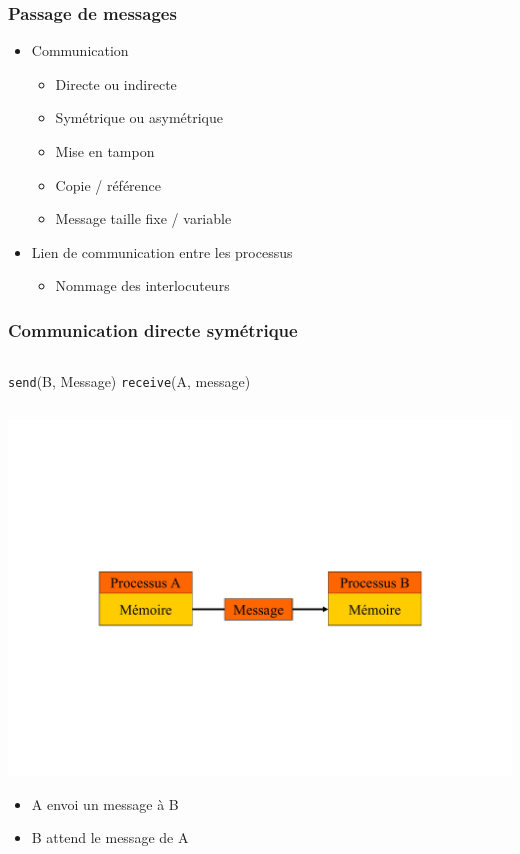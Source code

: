 \begin{frame}
\frametitle{Passage de messages}
\begin{itemize}
\item Communication
\begin{itemize}
\item Directe ou indirecte
\item Symétrique ou asymétrique
\item Mise en tampon
\item Copie / référence
\item Message taille fixe / variable
\end{itemize}
\item Lien de communication entre les processus
\begin{itemize}
\item Nommage des interlocuteurs
\end{itemize}
\end{itemize}
\end{frame}

\begin{frame}
\frametitle{Communication directe symétrique}
\begin{columns}
\texttt{send}(B, Message)
\texttt{receive}(A, message)
\end{columns}
\includegraphics[width=.9\textwidth]{../illustration/message_comm_directe.pdf}
\begin{itemize}
\item A envoi un message à B
\item B attend le message de A
\end{itemize}
\end{frame}

